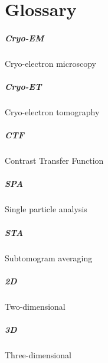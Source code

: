 \chapter{Glossary}

\paragraph{Cryo-EM} Cryo-electron microscopy
\paragraph{Cryo-ET} Cryo-electron tomography
\paragraph{CTF} Contrast Transfer Function
\paragraph{SPA} Single particle analysis
\paragraph{STA} Subtomogram averaging
\paragraph{2D} Two-dimensional
\paragraph{3D} Three-dimensional

